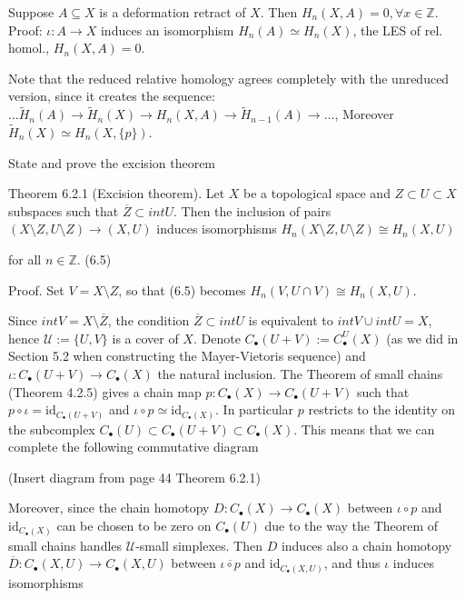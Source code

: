 Suppose \( A \subseteq X\) is a deformation retract of \( X \). Then \( H_n(X, A) = 0, \forall x \in \mathbb{Z}\).
Proof: \( \iota : A \to X\) induces an isomorphism \( H_n(A) \simeq H_n(X) \), the LES of rel. homol., \( H_n(X, A) = 0 \).

Note that the reduced relative homology agrees completely with the unreduced version, since it creates the sequence:
\( \dots \tilde{H}_n(A) \longrightarrow \tilde{H}_n(X) \longrightarrow H_n(X, A) \longrightarrow \tilde{H}_{n-1}(A) \longrightarrow \dots \),
Moreover \( \tilde{H}_n(X) \simeq H_n(X, \{p\}) \).


State and prove the excision theorem

Theorem 6.2.1 (Excision theorem). Let \(X\) be a topological space and \(Z \subset U \subset X\) subspaces such that \(\overline{Z} \subset int U\). 
Then the inclusion of pairs \((X \setminus Z, U \setminus Z) \to (X, U)\) induces isomorphisms 
\(H_n(X \setminus Z, U \setminus Z) \cong H_n(X, U)\)

for all \(n \in \mathbb{Z}\). \qquad (6.5)

Proof. Set \(V = X \setminus Z\), so that (6.5) becomes
\(H_n(V, U \cap V) \cong H_n(X, U).\)


Since \(int V = X \setminus \overline{Z}\), the condition \(\overline{Z} \subset int U\) is 
equivalent to \(int V \cup int U = X\), hence \(\mathcal{U} := \{U, V\}\) is a cover of \(X\). 
Denote \(C_\bullet(U + V) := C^{U}_\bullet(X)\) 
(as we did in Section 5.2 when constructing the Mayer-Vietoris sequence) 
and \(\iota: C_\bullet(U + V) \to C_\bullet(X)\) the natural inclusion. 
The Theorem of small chains (Theorem 4.2.5) gives a chain map \(p: C_\bullet(X) \to C_\bullet(U + V)\) 
such that \(p \circ \iota = \text{id}_{C_\bullet(U + V)}\) and \(\iota \circ p \simeq \text{id}_{C_\bullet(X)}\). 
In particular \(p\) restricts to the identity on the subcomplex \(C_\bullet(U) \subset C_\bullet(U + V) \subset C_\bullet(X)\). 
This means that we can complete the following commutative diagram 

(Insert diagram from page 44 Theorem 6.2.1)

Moreover, since the chain homotopy \(D: C_\bullet(X) \to C_\bullet(X)\) between \(\iota \circ p\) and \(\text{id}_{C_\bullet(X)}\) 
can be chosen to be zero on \(C_\bullet(U)\) due to the way the Theorem of small chains handles \( \mathcal{U} \)-small simplexes. 
Then \(D\) induces also a chain homotopy 
\(\overline{D}: C_\bullet(X, U) \to C_\bullet(X, U)\) between \(\overline{\iota \circ p}\) and \(\text{id}_{C_\bullet(X, U)}\), 
and thus \(\iota\) induces isomorphisms

